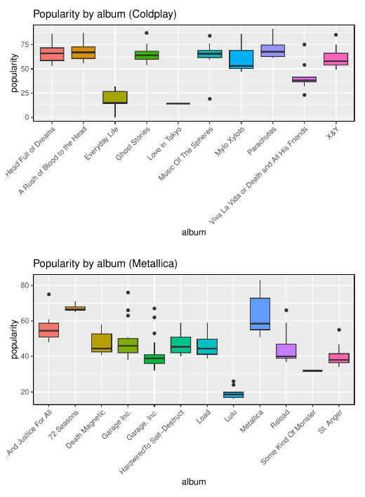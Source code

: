 \documentclass[11pt,preprint, authoryear]{elsarticle}
\let\origfigure\figure
\let\endorigfigure\endfigure
\renewenvironment{figure}[1][2] {
    \expandafter\origfigure\expandafter[H]
} {
    \endorigfigure
}
\numberwithin{equation}{section}
\numberwithin{figure}{section}
\numberwithin{table}{section}
\begin{document}
\begin{figure}[H]

{\centering \includegraphics{Question2_files/figure-latex/Figure1-1} 

}

\caption{Coldplay Album Popularity \label{Figure1}}\label{fig:Figure1}
\end{figure}

\begin{figure}[H]

{\centering \includegraphics{Question2_files/figure-latex/Figure2-1} 

}

\caption{Metallica Album Popularity \label{Figure2}}\label{fig:Figure2}
\end{figure}
\end{document}

